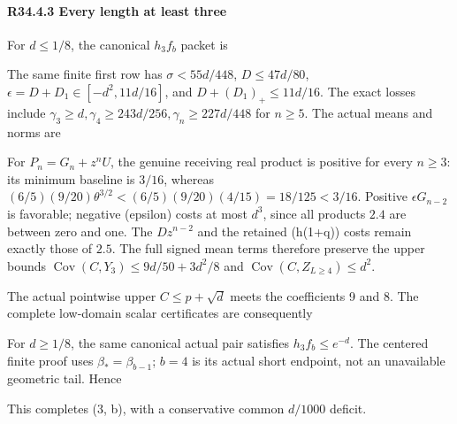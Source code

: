 

\paragraph{R34.4.3 Every length at least three}

For \(d\le1/8\), the canonical \(h_3f_b\) packet is


The same finite first row has \(\sigma<55d/448\),
\(D\le47d/80\), \(\epsilon=D+D_1\in[-d^2,\allowbreak  11d/16]\), and
\(D+(D_1)_+\le11d/16\). The exact losses include
\(\gamma_3\ge d,\allowbreak  \gamma_4\ge243d/256,\allowbreak  \gamma_n\ge227d/448\)
for \(n\ge5\). The actual means and norms are


For \(P_n=G_n+z^nU\), the genuine receiving real product is positive
for every \(n\ge3\): its minimum baseline is \(3/16\), whereas
\((6/5)(9/20)\theta^{3/2}<(6/5)(9/20)(4/15)=18/125<3/16\).
Positive \(\epsilon G_{n-2}\) is favorable; negative (epsilon) costs
at most \(d^3\), since all products \(2.4\) are between zero and one.
The \(Dz^{n-2}\) and the retained (h(1+q)) costs remain exactly those
of \(2.5\). The full signed mean terms therefore preserve the upper bounds
\(\operatorname{Cov}(C,\allowbreak  Y_3)\le9d/50+3d^2/8\) and
\(\operatorname{Cov}(C,\allowbreak  Z_{L\ge4})\le d^2\).

The actual pointwise upper \(C\le p+\sqrt d\) meets the coefficients
9 and 8. The complete low-domain scalar certificates are consequently


For \(d\ge1/8\), the same canonical actual pair satisfies
\(h_3f_b\le e^{-d}\). The centered finite proof uses
\(\beta_*=\beta_{b-1}\); \(b=4\) is its actual short endpoint, not an
unavailable geometric tail. Hence


This completes (3, b), with a conservative common \(d/1000\) deficit.

